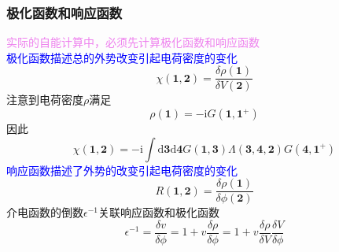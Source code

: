\documentclass[cjk,slidestop,compress,mathserif,blue]{beamer}
\begin{document}
\frame
{
	\frametitle{极化函数和响应函数}
	\textcolor{violet}{实际的自能计算中，必须先计算极化函数和响应函数}\\
	\textcolor{blue}{极化函数描述总的外势改变引起电荷密度的变化}
	\begin{displaymath}
		\chi(\mathbf{1},\mathbf{2})=\frac{\delta\rho(\mathbf{1})}{\delta V(\mathbf{2})}
	\end{displaymath}
	注意到电荷密度$\rho$满足
	\begin{displaymath}
		\rho(\mathbf{1})=-\mathrm{i}G(\mathbf{1},\mathbf{1}^{+})
	\end{displaymath}
	因此
	\begin{displaymath}
		\chi(\mathbf{1},\mathbf{2})=-\mathrm{i}\int\mathrm{d}\mathbf{3}\mathrm{d}\mathbf{4}G(\mathbf{1},\mathbf{3})\Lambda(\mathbf{3},\mathbf{4},\mathbf{2})G(\mathbf{4},\mathbf{1}^{+})
	\end{displaymath}
	\textcolor{blue}{响应函数描述了外势的改变引起电荷密度的变化}
	\begin{displaymath}
		R(\mathbf{1},\mathbf{2})=\frac{\delta\rho(\mathbf{1})}{\delta\phi(\mathbf{2})}
	\end{displaymath}
	介电函数的倒数$\epsilon^{-1}$关联响应函数和极化函数
	\vskip -10pt
	\begin{displaymath}
		\epsilon^{-1}=\frac{\delta v}{\delta\phi}=1+v\frac{\delta\rho}{\delta\phi}=1+v\frac{\delta\rho}{\delta V}\frac{\delta V}{\delta\phi}
	\end{displaymath}
}
\end{document}
